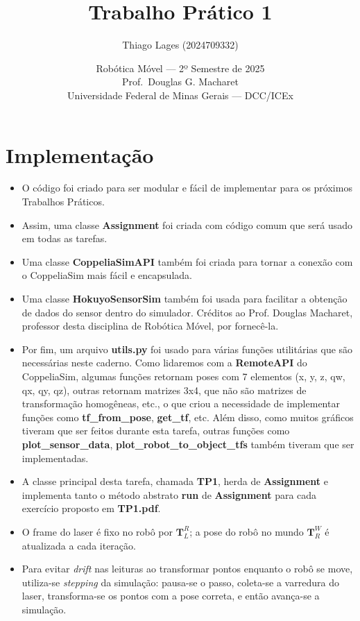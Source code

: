 \documentclass[12pt,a4paper]{article}
\title{Trabalho Prático 1}
\author{Thiago Lages (2024709332)}
\date{Robótica Móvel — 2º Semestre de 2025 \\ Prof.\ Douglas G. Macharet \\[6pt]
Universidade Federal de Minas Gerais — DCC/ICEx}
\newcommand{\mat}[1]{\mathbf{#1}}
\begin{document}
\maketitle

\section*{Implementação}
\begin{itemize}
  \item O código foi criado para ser modular e fácil de implementar para os próximos Trabalhos Práticos.
\item Assim, uma classe \textbf{Assignment} foi criada com código comum que será usado em todas as tarefas.

\item Uma classe \textbf{CoppeliaSimAPI} também foi criada para tornar a
conexão com o CoppeliaSim mais fácil e encapsulada.

\item Uma classe \textbf{HokuyoSensorSim} também foi usada para facilitar a obtenção de dados do sensor dentro do simulador. Créditos ao Prof. Douglas Macharet, professor desta disciplina de Robótica Móvel, por fornecê-la.

\item Por fim, um arquivo \textbf{utils.py} foi usado para várias funções utilitárias que são necessárias neste caderno. Como lidaremos com a \textbf{RemoteAPI} do CoppeliaSim, algumas funções retornam poses com 7 elementos (x, y, z, qw, qx, qy, qz), outras retornam matrizes 3x4, que não são matrizes de transformação homogêneas, etc., o que criou a necessidade de implementar funções como \textbf{tf\_from\_pose},
\textbf{get\_tf}, etc. Além disso, como muitos gráficos tiveram que ser feitos durante esta tarefa, outras funções como \textbf{plot\_sensor\_data}, \textbf{plot\_robot\_to\_object\_tfs} também tiveram que ser implementadas.
\item A classe principal desta tarefa, chamada \textbf{TP1}, herda de \textbf{Assignment} e implementa tanto o método abstrato \textbf{run} de \textbf{Assignment} para cada
exercício proposto em \textbf{TP1.pdf}.

  \item O frame do laser é fixo no robô por \(\mat{T}^{R}_{L}\); a pose do robô no mundo \(\mat{T}^{W}_{R}\) é atualizada a cada iteração.
  \item Para evitar \emph{drift} nas leituras ao transformar pontos enquanto o robô se move, utiliza-se \emph{stepping} da simulação: pausa-se o passo, coleta-se a varredura do laser, transforma-se os pontos com a pose correta, e então avança-se a simulação.
\end{itemize}
\end{document}
